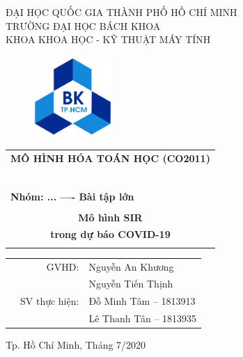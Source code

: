 \documentclass[a4paper]{article}
\begin{document}
\begin{titlepage}
\begin{center}
ĐẠI HỌC QUỐC GIA THÀNH PHỐ HỒ CHÍ MINH \\
TRƯỜNG ĐẠI HỌC BÁCH KHOA \\
KHOA KHOA HỌC - KỸ THUẬT MÁY TÍNH 
\end{center}

\vspace{1cm}

\begin{figure}[h!]
\begin{center}
\includegraphics[width=3cm]{Images/hcmut.png}
\end{center}
\end{figure}

\vspace{1cm}


\begin{center}
\begin{tabular}{c}
\multicolumn{1}{l}{\textbf{{\Large MÔ HÌNH HÓA TOÁN HỌC (CO2011)}}}\\
~~\\
\hline
\\
\multicolumn{1}{l}{\textbf{{\Large Nhóm: ... ---- Bài tập lớn}}}\\
\\
\textbf{{\Huge Mô hình SIR}} \\
\textbf{{\Huge trong dự báo COVID-19}}\\
\\
\hline
\end{tabular}
\end{center}

\vspace{1.5cm}

\begin{table}[h]
\begin{tabular}{rrl}
\hspace{5 cm} & GVHD: & Nguyễn An Khương\\
\hspace{5 cm} &  & Nguyễn Tiến Thịnh\\
& SV thực hiện: & Đỗ Minh Tâm -- 1813913 \\
& & Lê Thanh Tân -- 1813935\\

\end{tabular}
\end{table}
\vspace{1.5cm}
\begin{center}
{\footnotesize Tp. Hồ Chí Minh, Tháng 7/2020}
\end{center}
\end{titlepage}
\end{document}
